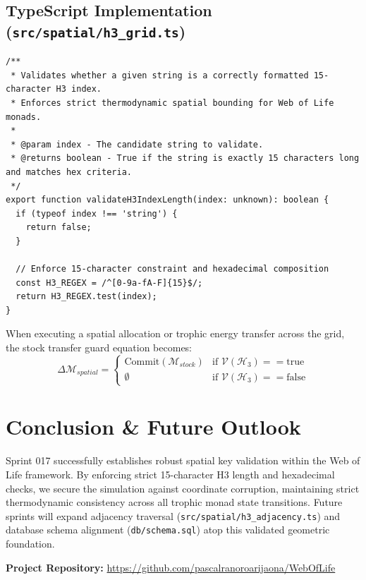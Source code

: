 \documentclass[11pt, a4paper]{article}
\begin{document}
\subsection{TypeScript Implementation (\texttt{src/spatial/h3\_grid.ts})}
\begin{verbatim}
/**
 * Validates whether a given string is a correctly formatted 15-character H3 index.
 * Enforces strict thermodynamic spatial bounding for Web of Life monads.
 * 
 * @param index - The candidate string to validate.
 * @returns boolean - True if the string is exactly 15 characters long and matches hex criteria.
 */
export function validateH3IndexLength(index: unknown): boolean {
  if (typeof index !== 'string') {
    return false;
  }
  
  // Enforce 15-character constraint and hexadecimal composition
  const H3_REGEX = /^[0-9a-fA-F]{15}$/;
  return H3_REGEX.test(index);
}
\end{verbatim}

When executing a spatial allocation or trophic energy transfer across the grid, the stock transfer guard equation becomes:
\begin{equation}
    \Delta \mathcal{M}_{spatial} = \begin{cases} 
    \text{Commit}(\mathcal{M}_{stock}) & \text{if } \mathcal{V}(\mathcal{H}_3) == \text{true} \\
    \emptyset & \text{if } \mathcal{V}(\mathcal{H}_3) == \text{false}
    \end{cases}
\end{equation}

\section{Conclusion \& Future Outlook}
Sprint 017 successfully establishes robust spatial key validation within the Web of Life framework. By enforcing strict 15-character H3 length and hexadecimal checks, we secure the simulation against coordinate corruption, maintaining strict thermodynamic consistency across all trophic monad state transitions. Future sprints will expand adjacency traversal (\texttt{src/spatial/h3\_adjacency.ts}) and database schema alignment (\texttt{db/schema.sql}) atop this validated geometric foundation.

\vspace{1em}
\noindent\textbf{Project Repository:} \url{https://github.com/pascalranoroarijaona/WebOfLife}
\end{document}
